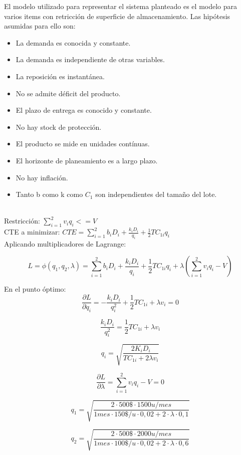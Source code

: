 \documentclass[a4paper,10pt]{article}
\begin{document}
    El modelo utilizado para representar el sistema planteado es el modelo para varios items con retricción de superficie de
almacenamiento. Las hipótesis asumidas para ello son:
    \begin{itemize}
      \item La demanda es conocida y constante.
      \item La demanda es independiente de otras variables.
      \item La reposición es instantánea.
      \item No se admite déficit del producto.
      \item El plazo de entrega es conocido y constante.
      \item No hay stock de protección.
      \item El producto se mide en unidades contínuas.
      \item El horizonte de planeamiento es a largo plazo.
      \item No hay inflación.
      \item Tanto b como k como $C_1$ son independientes del tamaño del lote.
    \end{itemize}

        \\
Restricción:      $ \sum_{i=1}^{2} v_i q_i <= V $  \\
 	
CTE a minimizar: $ CTE = \sum_{i=1}^{2} b_i D_i + \frac{k_i D_i}{q_i} + \frac{1}{2} T C_{1i} q_i $ \\

Aplicando multiplicadores de Lagrange:

	$$ L = \phi(q_1,q_2,\lambda) = \sum_{i=1}^{2} b_i D_i + \frac{k_i D_i}{q_i} + \frac{1}{2} T C_{1i} q_i +
	\lambda ( \sum_{i=1}^{2} v_i q_i - V ) $$

En el punto óptimo:
$$\frac{\partial L } {\partial q_i }   = -  \frac{ k_i D_i}{q_i^2}  + \frac{1}{2} T C_{1i} + \lambda v_i = 0$$

$$ \frac{ k_i D_i}{q_i^2} = \frac{1}{2} T C_{1i} + \lambda v_i $$

$$ q_i = \sqrt{ \frac{2K_i D_i}{TC_{1i} + 2 \lambda v_i}} $$

$$\frac{\partial L } {\partial \lambda }   = \sum_{i=1}^{2} v_i q_i - V  = 0$$




$$ q_1 = \sqrt{ \frac{2\cdot 500 \$\cdot 1500 u/mes }{1 mes \cdot 150 \$/u\cdot 0,02 + 2\cdot \lambda \cdot 0,1}} $$

$$ q_2 = \sqrt{ \frac{2\cdot 500 \$ \cdot2000 u/mes }{1 mes \cdot 100 \$/u \cdot 0,02 + 2 \cdot \lambda \cdot 0,6}} $$
\end{document}
